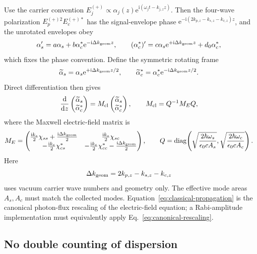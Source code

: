 \documentclass[11pt,a4paper]{article}
\newcommand{\dd}{\mathrm d}
\newcommand{\ii}{\mathrm i}
\newcommand{\e}{\mathrm e}
\begin{document}
Use the carrier convention
$E_j^{(+)}\propto\alpha_j(z)\e^{\ii(\omega_jt-k_{j,z}z)}$.
Then the four-wave polarization $E_p^{(+)2}E_c^{(+)*}$ has the signal-envelope
phase $\e^{-\ii(2k_{p,z}-k_{s,z}-k_{c,z})z}$, and the unrotated envelopes obey
\[
\alpha_s'=a\alpha_s+b\alpha_c^*\e^{-\ii\Delta k_{\rm geom}z},
\qquad
(\alpha_c^*)'=c\alpha_s\e^{+\ii\Delta k_{\rm geom}z}
+d_0\alpha_c^* ,
\]
which fixes the phase convention. Define the symmetric rotating frame
\[
\widetilde\alpha_s=\alpha_s\e^{+\ii\Delta k_{\rm geom}z/2},
\qquad
\widetilde\alpha_c^*=\alpha_c^*\e^{-\ii\Delta k_{\rm geom}z/2}.
\]
Direct differentiation then gives
\begin{equation}
\frac{\dd}{\dd z}
\begin{pmatrix}\widetilde\alpha_s\\\widetilde\alpha_c^*\end{pmatrix}
=M_{\rm cl}
\begin{pmatrix}\widetilde\alpha_s\\\widetilde\alpha_c^*\end{pmatrix},
\qquad
M_{\rm cl}=Q^{-1}M_EQ,
\label{eq:classical-propagation}
\end{equation}
where the Maxwell electric-field matrix is
\begin{equation}
M_E=
\begin{pmatrix}
\frac{\ii k_s}{2}\chi_{ss}+\frac{\ii\Delta k_{\rm geom}}2 &
\frac{\ii k_s}{2}\chi_{sc}\\
-\frac{\ii k_c}{2}\chi_{cs}^* &
-\frac{\ii k_c}{2}\chi_{cc}^*-\frac{\ii\Delta k_{\rm geom}}2
\end{pmatrix},\qquad
Q=\operatorname{diag}\!\left(
\sqrt{\frac{2\hbar\omega_s}{\epsilon_0cA_s}},
\sqrt{\frac{2\hbar\omega_c}{\epsilon_0cA_c}}\right).
\label{eq:electric-propagation}
\end{equation}
Here
\begin{equation}
\Delta k_{\rm geom}=2k_{p,z}-k_{s,z}-k_{c,z}
\label{eq:geometric-mismatch}
\end{equation}
uses vacuum carrier wave numbers and geometry only.
The effective mode areas $A_s,A_c$ must match the collected modes.
Equation~\eqref{eq:classical-propagation} is the canonical photon-flux
rescaling of the electric-field equation; a Rabi-amplitude implementation
must equivalently apply Eq.~\eqref{eq:canonical-rescaling}.

\subsection*{No double counting of dispersion}
\end{document}
